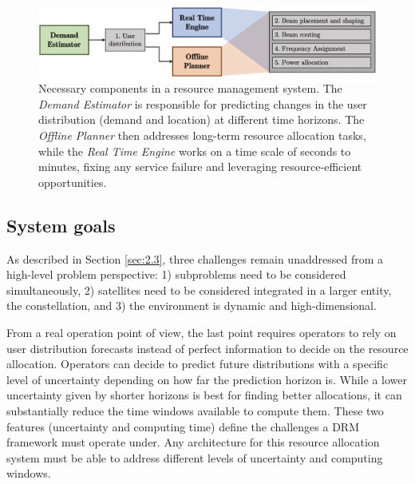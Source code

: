 \documentclass[letterpaper]{article} %
\begin{document}
\begin{figure}[t]
\begin{center}
\includegraphics[width=0.8\linewidth]{pics/block_diagram.png}
\end{center}
\caption{Necessary components in a resource management system. The \textit{Demand Estimator} is responsible for predicting changes in the user distribution (demand and location) at different time horizons. The \textit{Offline Planner} then addresses long-term resource allocation tasks, while the \textit{Real Time Engine} works on a time scale of seconds to minutes, fixing any service failure and leveraging resource-efficient opportunities.}
\label{fig:BlockDiagram}
\end{figure}

\subsection{System goals}

As described in Section \ref{sec:2.3}, three challenges remain unaddressed from a high-level problem perspective: 1) subproblems need to be considered simultaneously, 2) satellites need to be considered integrated in a larger entity, the constellation, and 3) the environment is dynamic and high-dimensional.

From a real operation point of view, the last point requires operators to rely on user distribution forecasts instead of perfect information to decide on the resource allocation. Operators can decide to predict future distributions with a specific level of uncertainty depending on how far the prediction horizon is. While a lower uncertainty given by shorter horizons is best for finding better allocations, it can substantially reduce the time windows available to compute them. These two features (uncertainty and computing time) define the challenges a DRM framework must operate under. Any architecture for this resource allocation system must be able to address different levels of uncertainty and computing windows.
\end{document}
